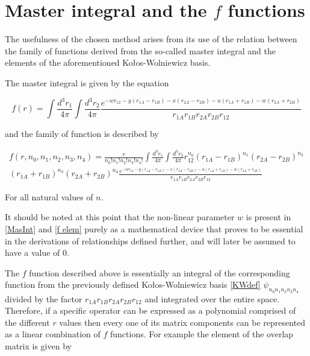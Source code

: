 \documentclass{pracalicmgr}
\begin{document}
\section{Master integral and the \texorpdfstring{$f$}{TEXT} functions}

The usefulness of the chosen method arises from its use of the relation between the family of functions derived from the so-called master integral and the elements of the aforementioned Kołos-Wolniewicz basis.

The master integral is given by the equation

\begin{equation}
    f\left(r\right) = \int{\frac{d^3 r_1}{4 \pi}}\int{\frac{d^3 r_2}{4 \pi}}\frac{e^{-wr_{12}-y\left(r_{1A}-r_{1B}\right)-x\left(r_{2A}-r_{2B}\right)-u\left(r_{1A}+r_{1B}\right)-w\left(r_{2A}+r_{2B}\right)}}{r_{1A} r_{1B} r_{2A} r_{2B} r_{12}}
    \label{MasInt}
\end{equation}

and the family of function is described by

\begin{multline}
    f\left(r,n_0, n_1, n_2, n_3, n_4\right) = \frac{r}{n_0! n_1! n_2! n_3! n_4!} \int{\frac{d^3 r_1}{4 \pi}}\int{\frac{d^3 r_2}{4 \pi}}r_{12}^{n_0}{\left(r_{1A}-r_{1B}\right)}^{n_1}{\left(r_{2A}-r_{2B}\right)}^{n_2}\\
    {\left(r_{1A}+r_{1B}\right)}^{n_3}{\left(r_{2A}+r_{2B}\right)}^{n_4}\frac{e^{-wr_{12}-y\left(r_{1A}-r_{1B}\right)-x\left(r_{2A}-r_{2B}\right)-u\left(r_{1A}+r_{1B}\right)-w\left(r_{2A}+r_{2B}\right)}}{r_{1A} r_{1B} r_{2A} r_{2B} r_{12}}
    \label{f elem}
\end{multline}

For all natural values of $n$.

It should be noted at this point that the non-linear parameter $w$ is present in \ref{MasInt} and \ref{f elem} purely as a mathematical device that proves to be essential in the derivations of relationships defined further, and will later be assumed to have a value of $0$.

The $f$ function described above is essentially an integral of the corresponding function from the previously defined Kołos-Wolniewicz basis \ref{KWdef} $\psi_{n_0 n_1 n_2 n_3 n_4}$ divided by the factor ${r_{1A} r_{1B} r_{2A} r_{2B} r_{12}}$ and integrated over the entire space. Therefore, if a specific operator can be expressed as a polynomial comprised of the different $r$ values then every one of its matrix components can be represented as a linear combination of $f$ functions. For example the element of the overlap matrix is given by
\end{document}

